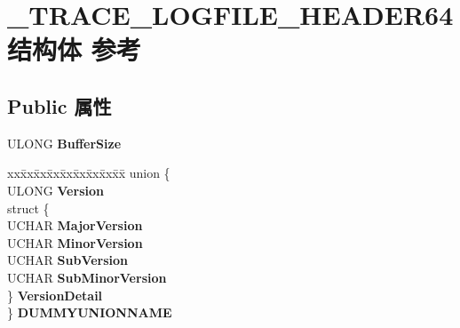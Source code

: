 \hypertarget{struct___t_r_a_c_e___l_o_g_f_i_l_e___h_e_a_d_e_r64}{}\section{\+\_\+\+T\+R\+A\+C\+E\+\_\+\+L\+O\+G\+F\+I\+L\+E\+\_\+\+H\+E\+A\+D\+E\+R64结构体 参考}
\label{struct___t_r_a_c_e___l_o_g_f_i_l_e___h_e_a_d_e_r64}
\subsection*{Public 属性}
\begin{DoxyCompactItemize}
\item 
\mbox{\label{struct___t_r_a_c_e___l_o_g_f_i_l_e___h_e_a_d_e_r64_a406c1f851eedf6e1810ff68c89e82286}} 
U\+L\+O\+NG {\bfseries Buffer\+Size}
\item 
\mbox{\label{struct___t_r_a_c_e___l_o_g_f_i_l_e___h_e_a_d_e_r64_a5783209af74d71bbb21b35e381d4555e}} 
\begin{tabbing}
xx\=xx\=xx\=xx\=xx\=xx\=xx\=xx\=xx\=\kill
union \{\\
\>ULONG {\bfseries Version}\\
\>struct \{\\
\>\>UCHAR {\bfseries MajorVersion}\\
\>\>UCHAR {\bfseries MinorVersion}\\
\>\>UCHAR {\bfseries SubVersion}\\
\>\>UCHAR {\bfseries SubMinorVersion}\\
\>\} {\bfseries VersionDetail}\\
\} {\bfseries DUMMYUNIONNAME}\\


\end{tabbing}
\end{DoxyCompactItemize}
